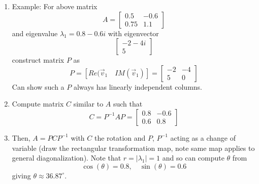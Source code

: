 \documentclass{article}
\begin{document}
\begin{enumerate}
\begin{enumerate}
\begin{itemize}
\[\begin{array}{cc}
a & -b \\
b & a
\end{array}
\right]
\]
with eigenvalues $\lambda = a \pm b i$. Drawing a right triangle with legs $a,b$ in the complex plane with hypotenuse $r = \sqrt{a^2+b^2}$, we have 
\[
C = r \left[
\begin{array}{cc}
a/r & -b/r \\
b/r & a/r
\end{array}
\right]
= \left[
\begin{array}{cc}
r & 0 \\
0 & r
\end{array}
\right]
\left[
\begin{array}{cc}
\cos(\theta) & -sin(\theta) \\
\sin(\theta) & \cos(\theta)
\end{array} \right]
\]
and we see the rotation then a scale.
\end{itemize}
\item Example: For above matrix
\[
A = \left[
\begin{array}{cc}
0.5 & -0.6 \\
0.75 & 1.1
\end{array}
\right]
\]
and eigenvalue $\lambda_1 = 0.8-0.6i$ with eigenvector
\[
\left[
\begin{array}{c}
-2-4i \\
5
\end{array}
\right]
\]
construct matrix $P$ as
\[
P = \left[
Re(\vec{v}_1  \quad IM(\vec{v}_1)
\right] = \left[
\begin{array}{cc}
-2 & -4 \\ 5 & 0
\end{array}
\right]
\]
Can show such a $P$ always has linearly independent columns.
\item Compute matrix $C$ similar to $A$ such that
\[
C = P^{-1} A P = \left[
\begin{array}{cc}
0.8 & -0.6 \\
0.6 & 0.8
\end{array}
\right]
\]
\item Then, $A = PCP^{-1}$ with $C$ the rotation and $P$, $P^{-1}$ acting as a change of variable (draw the rectangular transformation map, note same map applies to general diagonalization). Note that $r = |\lambda_1| = 1$ and so can compute $\theta$ from
\[
\cos(\theta) = 0.8, \quad \sin(\theta)=0.6
\]
giving $\theta \approx 36.87^{\circ}$.
\end{enumerate}


\end{enumerate}
\end{document}
